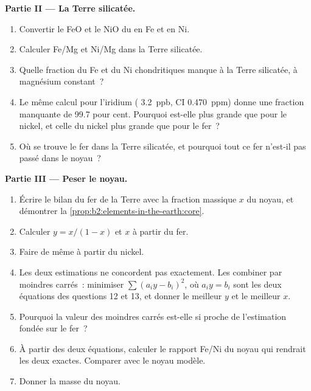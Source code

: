 \begin{problem}
\noindent\textbf{Partie II --- La Terre silicatée.}
\begin{enumerate}[resume]
\item Convertir le FeO et le NiO du  en Fe et en Ni.
\item Calculer Fe/Mg et Ni/Mg dans la Terre silicatée.
\item Quelle fraction du Fe et du Ni chondritiques manque à la Terre silicatée,
à magnésium constant~?
\item Le même calcul pour l'iridium ( \qty{3.2}{ppb}, CI
\qty{0.470}{ppm}) donne une fraction manquante de 99.7 pour cent. Pourquoi est-elle plus grande
que pour le nickel, et celle du nickel plus grande que pour le fer~?
\item Où se trouve le fer dans la Terre silicatée, et pourquoi tout ce fer n'est-il pas passé
dans le noyau~?
\end{enumerate}

\noindent\textbf{Partie III --- Peser le noyau.}
\begin{enumerate}[resume]
\item Écrire le bilan du fer de la Terre avec la fraction massique $x$ du noyau, et
démontrer la \cref{prop:b2:elements-in-the-earth:core}.
\item Calculer $y = x/(1-x)$ et $x$ à partir du fer.
\item Faire de même à partir du nickel.
\item Les deux estimations ne concordent pas exactement. Les combiner par moindres carrés~:
minimiser $\sum (a_iy - b_i)^2$, où $a_i y = b_i$ sont les deux équations des
questions 12 et 13, et donner le meilleur $y$ et le meilleur $x$.
\item Pourquoi la valeur des moindres carrés est-elle si proche de l'estimation fondée sur le fer~?
\item À partir des deux équations, calculer le rapport Fe/Ni du noyau qui rendrait les deux
exactes. Comparer avec le noyau modèle.
\item Donner la masse du noyau.
\end{enumerate}


\end{problem}

